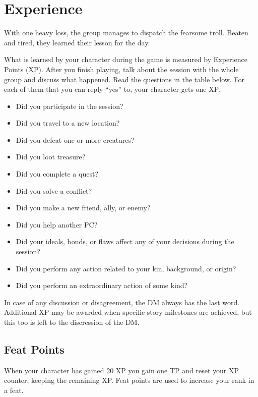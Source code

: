 \section{Experience}
With one heavy loss, the group manages to dispatch the fearsome troll.
Beaten and tired, they learned their lesson for the day.

What is learned by your character during the game is measured by Experience Points (XP).
After you finish playing, talk about the session with the whole group and discuss what happened.
Read the questions in the table below.
For each of them that you can reply ``yes'' to, your character gets one XP.

\begin{itemize}
    \item Did you participate in the session?
    \item Did you travel to a new location?
    \item Did you defeat one or more creatures?
    \item Did you loot treasure?
    \item Did you complete a quest?
    \item Did you solve a conflict?
    \item Did you make a new friend, ally, or enemy?
    \item Did you help another PC?
    \item Did your ideals, bonds, or flaws affect any of your decisions during the session?
    \item Did you perform any action related to your kin, background, or origin?
    \item Did you perform an extraordinary action of some kind?
\end{itemize}

In case of any discussion or disagreement, the DM always has the last word.
Additional XP may be awarded when specific story milestones are achieved, but this too is left to the discression of the DM.

\subsection*{Feat Points}
    When your character has gained 20 XP you gain one TP and reset your XP counter, keeping the remaining XP.
    Feat points are used to increase your rank in a feat.

